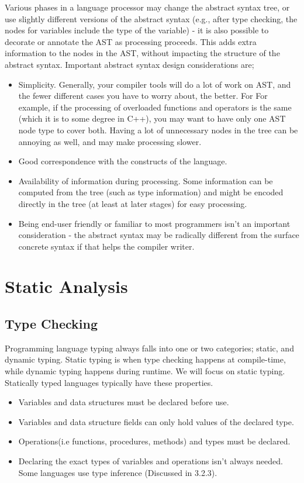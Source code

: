         Various phases in a language processor may change the abstract syntax
        tree, or use slightly different versions of the abstract syntax (e.g., after type
        checking, the nodes for variables include the type of the variable) - it is also
        possible to decorate or annotate the AST as processing proceeds. 
        This adds extra information to the nodes in the AST, without impacting the structure of the abstract syntax.
        Important abstract syntax design considerations are;
        \begin{itemize}
            \item Simplicity. Generally, your compiler tools will do a lot of work on AST,
            and the fewer different cases you have to worry about, the better. For
            For example, if the processing of overloaded functions and operators is the same (which it is to some degree in C++), you may want to have
            only one AST node type to cover both. Having a lot of unnecessary nodes
            in the tree can be annoying as well, and may make processing slower.
            \item Good correspondence with the constructs of the language.
            \item Availability of information during processing. Some information 
            can be computed from the tree (such as type information) and might be encoded directly in the tree (at least at later stages) for easy processing.
            \item Being end-user friendly or familiar to most programmers isn't an important consideration - the abstract syntax may be radically different from
            the surface concrete syntax if that helps the compiler writer.
        \end{itemize}

    \section{Static Analysis}
        \subsection{Type Checking}
        Programming language typing always falls into one or two categories; static, and dynamic typing. Static typing is when type checking happens at compile-time, 
        while dynamic typing happens during runtime. We will focus on static typing. 
        Statically typed languages typically have these properties.
        \begin{itemize}
            \item Variables and data structures must be declared before use.
            \item Variables and data structure fields can only hold values of the declared type.
            \item Operations(i.e functions, procedures, methods) and types must be declared.
            \item Declaring the exact types of variables and operations isn't always needed. Some languages use type inference (Discussed in 3.2.3).
        \end{itemize}

